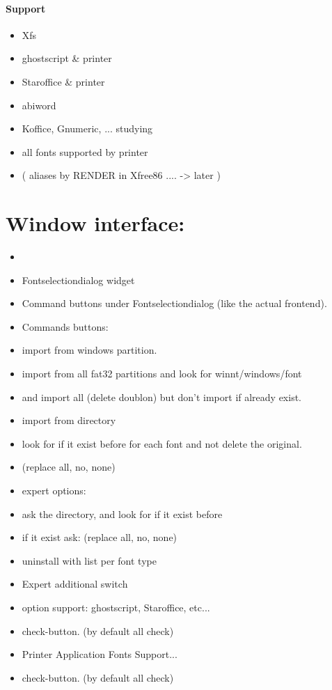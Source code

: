 \documentclass[onecolumn,11pt,oneside]{article}%
\begin{document}
\paragraph{Support}                
\begin{itemize} 
\item Xfs		      
\item ghostscript \& printer 
\item Staroffice \& printer  
\item abiword		      
\item Koffice, Gnumeric, ... studying
\item all fonts supported by printer
\item ( aliases by RENDER in Xfree86 .... -> later )
\end{itemize}


\section{Window interface:}
\begin{itemize} 
\item
\item Fontselectiondialog widget
\item Command buttons under Fontselectiondialog (like the actual frontend).
\item Commands buttons:	      
\item import from windows partition.
\item import from all fat32 partitions and look for winnt/windows/font
\item and import all (delete doublon) but don't import if already exist.
\item import from directory     
\item look for if it exist before for each font and not delete the original.
\item (replace all, no, none)
\item expert options:	      
\item ask the directory, and look for if it exist before
\item if it exist ask: (replace all, no, none)
\item uninstall with list per font type
\item Expert additional switch
\item option support:   ghostscript, Staroffice, etc...
\item check-button. (by default all check)
\item Printer Application Fonts Support...
\item check-button. (by default all check)
\end{itemize}
\end{document}
